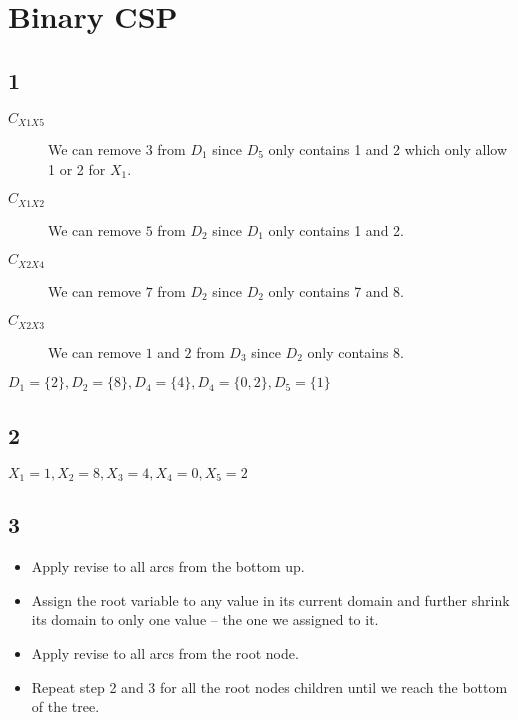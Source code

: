 \section{Binary CSP}
\subsection{1}


\begin{description}
	\item[$C_{X1X5}$] We can remove $3$ from $D_{1}$ since $D_5$ only contains 1 and 2 which only allow 1 or 2 for $X_1$.
	\item[$C_{X1X2}$] We can remove $5$ from $D_{2}$ since $D_1$ only contains 1 and 2.
	\item[$C_{X2X4}$] We can remove $7$ from $D_{2}$ since $D_2$ only contains 7 and 8.
	\item[$C_{X2X3}$] We can remove $1$ and $2$ from $D_{3}$ since $D_2$ only contains 8.
\end{description}


$D_1 = \{2\}, D_2 = \{8\}, D_4 = \{4\}, D_4 = \{0, 2\}, D_5 = \{1\}$
\subsection{2}


$X_1 = 1, X_2 = 8, X_3 = 4, X_4 = 0, X_5 = 2$

\subsection{3}

\begin{itemize}
	\item Apply revise to all arcs from the bottom up.
	\item Assign the root variable to any value in its current domain and further shrink its domain to only one value -- the one we assigned to it.
	\item Apply revise to all arcs from the root node.
	\item Repeat step 2 and 3 for all the root nodes children until we reach the bottom of the tree.
\end{itemize}
